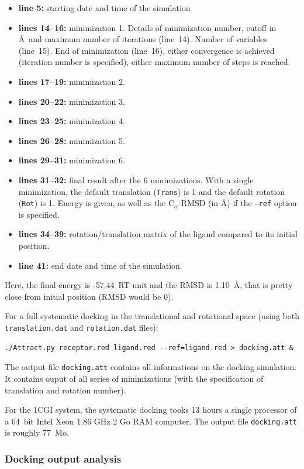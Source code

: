 \documentclass[12pt,a4paper]{article}
\begin{document}
\begin{itemize}
\item{\bf line 5:} starting date and time of the simulation
\item{\bf lines 14--16:} minimization 1. Details of minimization number, cutoff in \AA\ and maximum number of iterations (line~14). 
Number of variables (line~15). End of minimization (line~16), either convergence is achieved (iteration number is specified), either maximum number of steps is reached.
\item{\bf lines 17--19:} minimization 2.
\item{\bf lines 20--22:} minimization 3.
\item{\bf lines 23--25:} minimization 4.
\item{\bf lines 26--28:} minimization 5.
\item{\bf lines 29--31:} minimization 6.
\item{\bf lines 31--32:} final result after the 6 minimizations. With a single minimization, 
the default translation ({\tt Trans}) is 1 and the default rotation ({\tt Rot}) is 1. 
Energy is given, as well as the C$_{\alpha}$-RMSD (in \AA) if the {\tt --ref} option is specified.
\item{\bf lines 34--39:} rotation/translation matrix of the ligand compared to its initial position.
\item{\bf line 41:} end date and time of the simulation.
\end{itemize}

Here, the final energy is -57.44~RT unit and the RMSD is 1.10~\AA, that is pretty close from initial position (RMSD would be 0).

For a full systematic docking in the translational and rotational space (using both {\tt translation.dat}
and {\tt rotation.dat} files):
\begin{verbatim}
./Attract.py receptor.red ligand.red --ref=ligand.red > docking.att &
\end{verbatim}

The output file {\tt docking.att} contains all informations on the docking simulation. 
It contains ouput of all series of minimizations (with the specification of translation and rotation number).

For the 1CGI system, the systematic docking tooks 13 hours a single processor of a 64~bit Intel Xeon 1.86 GHz 2 Go RAM computer.
The output file {\tt docking.att} is roughly 77~Mo.

\subsubsection{Docking output analysis}
\end{document}
